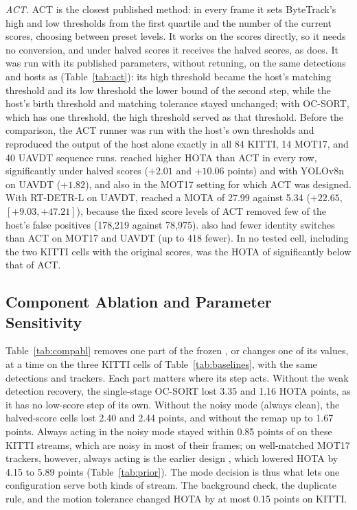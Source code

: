 \emph{ACT.} ACT \cite{act2026adaptive} is the closest published method: in every frame it sets
ByteTrack's high and low thresholds from the first quartile and the number of the current scores,
choosing between preset levels. It works on the scores directly, so it needs no conversion, and
under halved scores it receives the halved scores, as \scl{} does. It was run with its published
parameters, without retuning, on the same detections and hosts as \scl{} (Table~\ref{tab:act}):
its high threshold became the host's matching threshold and its low threshold the lower bound of
the second step, while the host's birth threshold and matching tolerance stayed unchanged; with
OC-SORT, which has one threshold, the high threshold served as that threshold. Before the
comparison, the ACT runner was run with the host's own thresholds and reproduced the output of the
host alone exactly in all 84 KITTI, 14 MOT17, and 40 UAVDT sequence runs. \scl{} reached higher HOTA
than ACT in every row, significantly under halved
scores ($+2.01$ and $+10.06$ points) and with YOLOv8n on UAVDT ($+1.82$), and also in the MOT17
setting for which ACT was designed. With RT-DETR-L on UAVDT, \scl{} reached a MOTA of 27.99 against
5.34 ($+22.65$, $[+9.03,+47.21]$), because the fixed score levels of ACT removed few of the host's
false positives (178,219 against 78,975). \scl{} also had fewer identity switches than ACT on
MOT17 and UAVDT (up to 418 fewer). In no tested cell, including the two KITTI cells with the
original scores, was the HOTA of \scl{} significantly below that of ACT.

\subsection{Component Ablation and Parameter Sensitivity}\label{sec:ablation}
Table~\ref{tab:compabl} removes one part of the frozen \scl{}, or changes one of its values, at a
time on the three KITTI cells of Table~\ref{tab:baselines}, with the same detections and trackers.
Each part matters where its step acts. Without the weak detection recovery, the single-stage
OC-SORT lost 3.35 and 1.16 HOTA points, as it has no low-score step of its own. Without the noisy
mode (always clean), the halved-score cells lost 2.40 and 2.44 points, and without the remap up to
1.67 points. Always acting in the noisy mode stayed within 0.85 points of \scl{} on these KITTI
streams, which are noisy in most of their frames; on well-matched MOT17 trackers, however, always
acting is the earlier design \aob{}, which lowered HOTA by 4.15 to 5.89 points
(Table~\ref{tab:prior}). The mode decision is thus what lets one configuration serve both kinds of
stream. The background check, the duplicate rule, and the motion tolerance changed HOTA by at most
0.15 points on KITTI.


